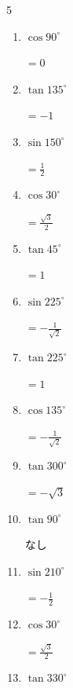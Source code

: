 \begin{multicols}{5}
\begin{enumerate}
        $\displaystyle なし$

  \item $\displaystyle \cos{90^\circ}$

        $\displaystyle =0$

  \item $\displaystyle \tan{135^\circ}$

        $\displaystyle =-1$

\columnbreak %

  \item $\displaystyle \sin{150^\circ}$

        $\displaystyle =\frac{1}{2}$

  \item $\displaystyle \cos{30^\circ}$

        $\displaystyle =\frac{\sqrt{3}}{2}$

  \item $\displaystyle \tan{45^\circ}$

        $\displaystyle =1$

  \item $\displaystyle \sin{225^\circ}$

        $\displaystyle =-\frac{1}{\sqrt{2}}$

  \item $\displaystyle \tan{225^\circ}$

        $\displaystyle =1$

  \item $\displaystyle \cos{135^\circ}$

        $\displaystyle =-\frac{1}{\sqrt{2}}$

  \item $\displaystyle \tan{300^\circ}$

        $\displaystyle =-\sqrt{3}$

  \item $\displaystyle \tan{90^\circ}$

        $\displaystyle なし$

  \item $\displaystyle \sin{210^\circ}$

        $\displaystyle =-\frac{1}{2}$

  \item $\displaystyle \cos{30^\circ}$

        $\displaystyle =\frac{\sqrt{3}}{2}$

  \item $\displaystyle \tan{330^\circ}$


\end{enumerate}
\end{multicols}
